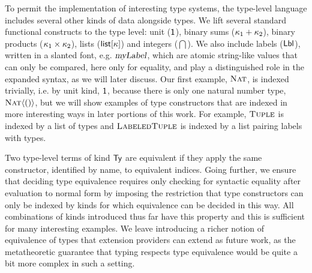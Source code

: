 To permit the implementation of interesting type systems, the type-level language includes several other kinds of data alongside types. We lift several  standard functional constructs to the type level: unit ($\textsf{1}$), binary sums ($\kappa_1 + \kappa_2$), binary products ($\kappa_1 \times \kappa_2$), lists ($\textsf{list}[\kappa]$) and integers ($\dint$). We also include labels ($\textsf{Lbl}$), written in a slanted font, e.g. $\textsl{myLabel}$, which are atomic string-like values that can only be compared, here only for equality, and play a distinguished role in the expanded syntax, as we will later discuss. Our first example, $\textsc{Nat}$, is indexed trivially, i.e. by unit kind, $\textsf{1}$, because there is only one natural number type, $\textsc{Nat}\langle()\rangle$, but we will show examples of type constructors that are indexed in more interesting ways in later portions of this work. For example, $\textsc{Tuple}$ is indexed by a list of types and $\textsc{LabeledTuple}$ is indexed by a list pairing labels with types.  

Two type-level terms of kind $\textsf{Ty}$ are equivalent if they apply the same constructor, identified by name, to equivalent indices. Going further, we ensure that deciding type equivalence requires only checking for syntactic equality after evaluation to normal form by imposing the restriction that type constructors can only be indexed by kinds for which equivalence can be decided in this way. All combinations of kinds introduced thus far  have this property and this is sufficient for many interesting examples. We leave  introducing a richer notion of  equivalence of types that  extension providers can extend as future work, as the metatheoretic guarantee that typing respects type equivalence would be quite a bit more complex in such a setting.%

